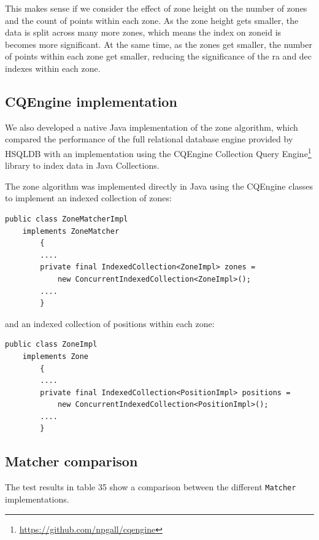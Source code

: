 \documentclass{article}
\newcommand{\hsqldb} {HSQLDB\xspace}
\newcommand{\cqengine} {CQEngine\xspace}
\newcommand{\footurl}[1] {\footnote{\url{#1}}}
\begin{document}
This makes sense if we consider the effect of zone height on the number of zones and the count of points within each zone.
As the zone height gets smaller, the data is split across many more zones, which means the index on zoneid is becomes more significant. At the same time, as the zones get smaller, the number of points within each zone get smaller, reducing the significance of the ra and dec indexes within each zone.

\subsection{CQEngine implementation}
\label{cqengine-implementation}

We also developed a native Java implementation of the zone algorithm, which compared the performance of the full relational database engine provided by \hsqldb with an implementation using the \cqengine Collection Query Engine\footurl{https://github.com/npgall/cqengine} library to index data in Java Collections.

The zone algorithm was implemented directly in Java using the \cqengine classes to implement an indexed collection of zones:

\begin{lstlisting}[style=Java]
    public class ZoneMatcherImpl
    implements ZoneMatcher
        {
        ....
        private final IndexedCollection<ZoneImpl> zones =
            new ConcurrentIndexedCollection<ZoneImpl>();
        ....
        }
\end{lstlisting}

and an indexed collection of positions within each zone:

\begin{lstlisting}[style=Java]
    public class ZoneImpl
    implements Zone
        {
        ....
        private final IndexedCollection<PositionImpl> positions =
            new ConcurrentIndexedCollection<PositionImpl>();
        ....
        }
\end{lstlisting}

\subsection{Matcher comparison}
\label{cqengine-indexing}

The test results in table 35 show a comparison between the different \texttt{Matcher} implementations.
\end{document}
